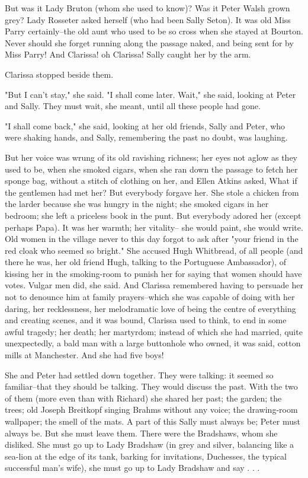 \documentclass[lang=cn,10pt]{elegantbook}
\begin{document}
But was it Lady Bruton (whom she used to know)?  Was it Peter Walsh
grown grey?  Lady Rosseter asked herself (who had been Sally
Seton).  It was old Miss Parry certainly--the old aunt who used to
be so cross when she stayed at Bourton.  Never should she forget
running along the passage naked, and being sent for by Miss Parry!
And Clarissa! oh Clarissa!  Sally caught her by the arm.

Clarissa stopped beside them.

"But I can't stay," she said.  "I shall come later.  Wait," she
said, looking at Peter and Sally.  They must wait, she meant, until
all these people had gone.

"I shall come back," she said, looking at her old friends, Sally
and Peter, who were shaking hands, and Sally, remembering the past
no doubt, was laughing.

But her voice was wrung of its old ravishing richness; her eyes not
aglow as they used to be, when she smoked cigars, when she ran down
the passage to fetch her sponge bag, without a stitch of clothing
on her, and Ellen Atkins asked, What if the gentlemen had met her?
But everybody forgave her.  She stole a chicken from the larder
because she was hungry in the night; she smoked cigars in her
bedroom; she left a priceless book in the punt.  But everybody
adored her (except perhaps Papa).  It was her warmth; her vitality--
she would paint, she would write.  Old women in the village never
to this day forgot to ask after "your friend in the red cloak who
seemed so bright."  She accused Hugh Whitbread, of all people (and
there he was, her old friend Hugh, talking to the Portuguese
Ambassador), of kissing her in the smoking-room to punish her for
saying that women should have votes.  Vulgar men did, she said.
And Clarissa remembered having to persuade her not to denounce him
at family prayers--which she was capable of doing with her daring,
her recklessness, her melodramatic love of being the centre of
everything and creating scenes, and it was bound, Clarissa used to
think, to end in some awful tragedy; her death; her martyrdom;
instead of which she had married, quite unexpectedly, a bald man
with a large buttonhole who owned, it was said, cotton mills at
Manchester.  And she had five boys!

She and Peter had settled down together.  They were talking: it
seemed so familiar--that they should be talking.  They would
discuss the past.  With the two of them (more even than with
Richard) she shared her past; the garden; the trees; old Joseph
Breitkopf singing Brahms without any voice; the drawing-room
wallpaper; the smell of the mats.  A part of this Sally must always
be; Peter must always be.  But she must leave them.  There were the
Bradshaws, whom she disliked.  She must go up to Lady Bradshaw (in
grey and silver, balancing like a sea-lion at the edge of its tank,
barking for invitations, Duchesses, the typical successful man's
wife), she must go up to Lady Bradshaw and say . . .
\end{document}
